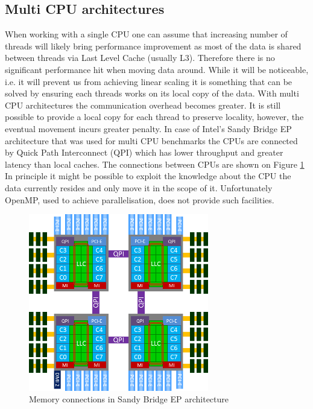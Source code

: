\documentclass[12pt, a4paper]{report}
\begin{document}
\subsection{Multi CPU architectures}\label{subsec:mult-cpu-arch}
When working with a single CPU one can assume that increasing number of threads
will likely bring performance improvement as most of the data is shared between
threads via Last Level Cache (usually L3). Therefore there is no significant
performance hit when moving data around. While it will be noticeable, i.e.
it will prevent us from achieving linear scaling it is something that can
be solved by ensuring each threads works on its local copy of the data. With
multi CPU architectures the communication overhead becomes greater. It is still
possible to provide a local copy for each thread to preserve locality, however,
the eventual movement incurs greater penalty. In case of Intel's Sandy Bridge
EP architecture that was used for multi CPU benchmarks the CPUs are connected
by Quick Path Interconnect (QPI) which has lower throughput and greater latency
than local caches. The connections between CPUs are shown on Figure
\ref{fig:sandy-bridge-ep-arch} In principle it might be possible to exploit the
knowledge about the CPU the data currently resides and only move it in the
scope of it. Unfortunately OpenMP, used to achieve parallelisation, does not
provide such facilities.

\begin{figure}[H]
  \begin{center}
    \includegraphics[width=0.7\textwidth,natwidth=593,natheight=585]{images/SandyBridgeEP4c.png}
    \caption{Memory connections in Sandy Bridge EP architecture}
    \label{fig:sandy-bridge-ep-arch}
  \end{center}
\end{figure}
\end{document}
